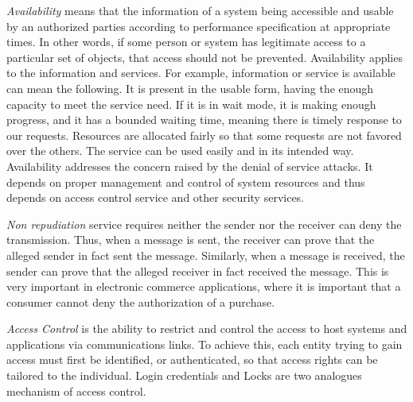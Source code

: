 	\textit{Availability} means that the information of a system being accessible and usable by an authorized parties according to performance specification at appropriate times.
	In other words, if some person or system has legitimate access to a particular set of objects, that access should not be prevented.
	Availability applies to the information and services.
	For example, information or service is available can mean the following. 
	It is present in the usable form, having the enough capacity to meet the service need.
	If it is in wait mode, it is making enough progress, and it has a bounded waiting time, meaning there is timely response to our requests.
	Resources are allocated fairly so that some requests are not favored over the others.
	The service can be used easily and in its intended way.
	Availability addresses the concern raised by the denial of service attacks.
	It depends on proper management and control of system resources and thus depends on access control service and other security services.

	\textit{Non repudiation} service requires neither the sender nor the receiver can deny the transmission.
	Thus, when a message is sent, the receiver can prove that the alleged sender in fact sent the message.
	Similarly, when a message is received, the sender can prove that the alleged receiver in fact received the message.
	This is very important in electronic commerce applications, where it is important that a consumer cannot deny the authorization of a purchase.

	\textit{Access Control} is the ability to restrict and control the access to host systems and applications via communications links.
	To achieve this, each entity trying to gain access must first be identified, or
	authenticated, so that access rights can be tailored to the individual.
	Login credentials and Locks are two analogues mechanism of access control.

